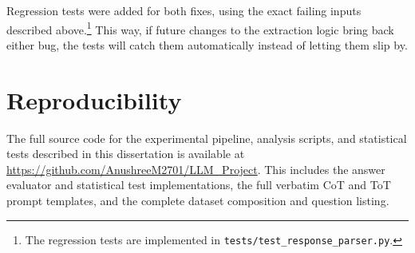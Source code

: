Regression tests were added for both fixes, using the exact failing
inputs described above.\footnote{The regression tests are implemented
in \texttt{tests/test\_response\_parser.py}.} This way, if future
changes to the extraction logic bring back either bug, the tests will
catch them automatically instead of letting them slip by.

\section{Reproducibility}

The full source code for the experimental pipeline, analysis scripts,
and statistical tests described in this dissertation is available at
\url{https://github.com/AnushreeM2701/LLM_Project}. This includes the
answer evaluator and statistical test implementations, the full
verbatim CoT and ToT prompt templates, and the complete dataset
composition and question listing.
